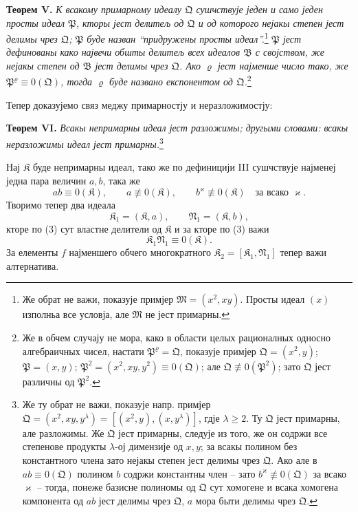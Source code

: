 ﻿\documentclass[11pt]{article}
\newcommand{\ideal}[1]{\mathfrak{#1}}
\begin{document}
\textbf{Теорем V.} \emph{К всакому примарному идеалу \(\ideal Q\) сушчствује једен и само једен просты идеал \(\ideal P\), кторы јест делитељ од \(\ideal Q\) и од которого нејакы степен јест делимы чрез \(\ideal Q\); \(\ideal P\) буде назван ``придружены просты идеал''.}\footnote{Же обрат не важи, показује примјер \(\ideal M=(x^2,xy)\). Просты идеал \((x)\) изполньа все условја, але \(\ideal M\) не јест примарны.} \emph{\(\ideal P\) јест дефинованы како највечи обшты делитељ всех идеалов \(\ideal B\) с својством, же нејакы степен од \(\ideal B\) јест делимы чрез \(\ideal Q\). Ако \(\varrho\) јест најменше число тако, же \(\ideal P^\varrho\equiv0(\ideal Q)\), тогда \(\varrho\) буде названо експонентом од \(\ideal Q\).}\footnote{Же в обчем случају не мора, како в области целых рационалных односно алгебраичных чисел, настати \(\ideal P^\varrho=\ideal Q\), показује примјер \(\ideal Q=(x^2,y)\); \(\ideal P=(x,y)\); \(\ideal P^2=(x^2,xy,y^2)\equiv0(\ideal Q)\); але \(\ideal Q\not\equiv0(\ideal P^2)\); зато \(\ideal Q\) јест различны од \(\ideal P^2\).}

Тепер доказујемо связ меджу примарностју и неразложимостју:

\textbf{Теорем VI.} \emph{Всакы непримарны идеал јест разложимы; другыми словами: всакы неразложимы идеал јест примарны.}\footnote{Же ту обрат не важи, показује напр. примјер \(\ideal Q=(x^2,xy,y^\lambda)=[(x^2,y),(x,y^\lambda)]\), гдје \(\lambda\ge2\). Ту \(\ideal Q\) јест примарны, але разложимы. Же \(\ideal Q\) јест примарны, следује из того, же он содржи все степенове продукты \(\lambda\)-ој димензије од \(x,y\); за всакы полином без константного члена зато нејакы степен јест делимы чрез \(\ideal Q\). Ако але в \(ab\equiv0(\ideal Q)\) полином \(b\) содржи константны член -- зато \(b^\varkappa\not\equiv0(\ideal Q)\) за всако \(\varkappa\) -- тогда, понеже базисне полиномы од \(\ideal Q\) сут хомогене и всака хомогена компонента од \(ab\) јест делимы чрез \(\ideal Q\), \(a\) мора быти делимы чрез \(\ideal Q\).}

Нај \(\ideal K\) буде непримарны идеал, тако же по дефиницији III сушчствује најменеј једна пара величин \(a,b\), така же
\begin{equation}
 a b\equiv0(\ideal K),\qquad
 a\not\equiv0(\ideal K),\qquad
 b^\varkappa\not\equiv0(\ideal K)\quad\text{за всако }\varkappa.
\tag{3}
\end{equation}
Творимо тепер два идеала
\[
 \ideal K_1=(\ideal K,a),\qquad \ideal N_1=(\ideal K,b),
\]
кторе по (3) сут властне делители од \(\ideal K\) и за кторе по (3) важи
\begin{equation}
 \ideal K_1\ideal N_1\equiv0(\ideal K).
\tag{4}
\end{equation}
За елементы \(f\) најменшего обчего многократного \(\ideal K_2=[\ideal K_1,\ideal N_1]\) тепер важи алтернатива.
\end{document}
